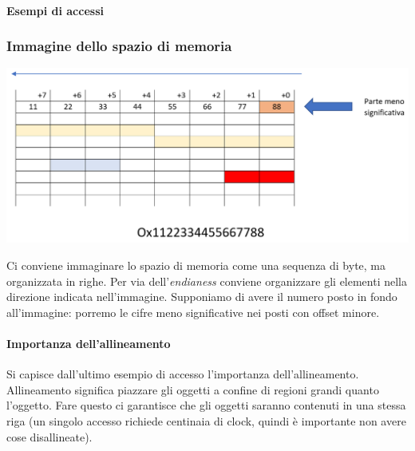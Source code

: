 \paragraph{Esempi di accessi} 
			\subsubsection{Immagine dello spazio di memoria}
			\begin{center}
				\includegraphics[scale=0.72]{img/9.PNG}
			\end{center}
			Ci conviene immaginare lo spazio di memoria come una sequenza di byte, ma organizzata in righe. Per via dell'\emph{endianess} conviene organizzare gli elementi nella direzione indicata nell'immagine. Supponiamo di avere il numero posto in fondo all'immagine: porremo le cifre meno significative nei posti con offset minore.
			
			\paragraph{Importanza dell'allineamento} Si capisce dall'ultimo esempio di accesso l'importanza dell'allineamento. Allineamento significa piazzare gli oggetti a confine di regioni grandi quanto l'oggetto. Fare questo ci garantisce che gli oggetti saranno contenuti in una stessa riga (un singolo accesso richiede centinaia di clock, quindi è importante non avere cose disallineate).
			
